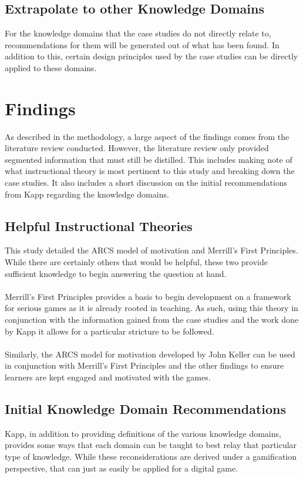 \documentclass[conference]{IEEEtran}
\begin{document}
\subsection{Extrapolate to other Knowledge Domains}
For the knowledge domains that the case studies do not directly relate to, recommendations for them will be generated out of what has been found. In addition to this, certain design principles used by the case studies can be directly applied to these domains.

\section{Findings}
As described in the methodology, a large aspect of the findings comes from the literature review conducted. However, the literature review only provided segmented information that must still be distilled. This includes making note of what instructional theory is most pertinent to this study and breaking down the case studies. It also includes a short discussion on the initial recommendations from Kapp\cite{Kapp2012a} regarding the knowledge domains.

\subsection{Helpful Instructional Theories}
This study detailed the ARCS model of motivation and Merrill's First Principles. While there are certainly others that would be helpful, these two provide sufficient knowledge to begin answering the question at hand. 
\\\\
Merrill's First Principles\cite{Merrill2002} provides a basis to begin development on a framework for serious games as it is already rooted in teaching. As such, using this theory in conjunction with the information gained from the case studies and the work done by Kapp\cite{Kapp2012a} it allows for a particular stricture to be followed.
\\\\
Similarly, the ARCS model for motivation developed by John Keller\cite{keller1987development} can be used in conjunction with Merrill's First Principles and the other findings to ensure learners are kept engaged and motivated with the games.

\subsection{Initial Knowledge Domain Recommendations}
Kapp\cite{Kapp2012a}, in addition to providing definitions of the various knowledge domains, provides some ways that each domain can be taught to best relay that particular type of knowledge. While these reconsiderations are derived under a gamification perspective, that can just as easily be applied for a digital game.
\end{document}
